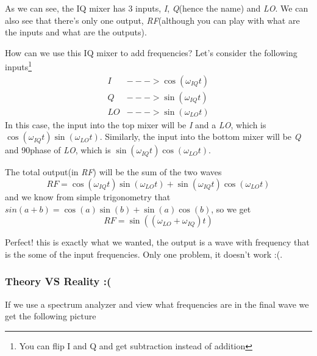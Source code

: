 \documentclass[english, a4paper, 12pt, twoside]{article}
\numberwithin{equation}{section} %
\begin{document}
As we can see, the IQ mixer has 3 inputs, \textit{I}, \textit{Q}(hence the name) and \textit{LO}. We can also see that there's only one output, \textit{RF}(although you can play with what are the inputs and what are the outputs).

How can we use this IQ mixer to add frequencies? Let's consider the following inputs\footnote{You can flip I and Q and get subtraction instead of addition}
\begin{align*}
    I &---> \cos(\omega_{IQ} t)\\
    Q &---> \sin(\omega_{IQ} t)\\
    LO &---> \sin(\omega_{LO}t)
\end{align*}
In this case, the input into the top mixer will be \textit{I} and a \textit{LO}, which is $\cos(\omega_{IQ}t)\sin(\omega_{LO}t)$. Similarly, the input into the bottom mixer will be \textit{Q} and 90\degree phase of \textit{LO}, which is $\sin(\omega_{IQ}t)\cos(\omega_{LO}t)$.

The total output(in \textit{RF}) will be the sum of the two waves
$$RF = \cos(\omega_{IQ}t)\sin(\omega_{LO}t) + \sin(\omega_{IQ}t)\cos(\omega_{LO}t)$$
and we know from simple trigonometry that $sin(a + b) = \cos(a)\sin(b) + \sin(a)\cos(b)$, so we get
\begin{equation}
    \boxed{RF = \sin((\omega_{LO} + \omega_{IQ})t)}
\end{equation}

Perfect! this is exactly what we wanted, the output is a wave with frequency that is the some of the input frequencies. Only one problem, it doesn't work :(.

\subsubsection{Theory VS Reality :(} %
If we use a spectrum analyzer and view what frequencies are in the final wave we get the following picture
\end{document}
